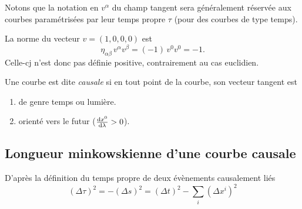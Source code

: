 {Notons que la notation en $v^\alpha$ du champ tangent sera généralement réservée aux courbes paramétrisées par leur temps propre $\tau$ (pour des courbes de type temps).
\begin{exmp}
    La norme du vecteur $v = (1,0,0,0)$ est
    \begin{equation}
        \eta_{\alpha \beta}\,v^{\alpha} v^{\beta} = (-1)\, v^{0} v^{0} =-1.
    \end{equation}
    Celle-cj n'est donc pas définie positive, contrairement au cas euclidien.
\end{exmp}
\begin{theoremframe}
    \begin{defi}
        Une courbe est dite \emph{causale} si en tout point de la courbe, son vecteur tangent est
        \begin{enumerate}[label = \roman*.]
            \item de genre temps ou lumière.
            \item orienté vers le futur ($\frac{\mathrm{d} x^0}{\mathrm{d}\lambda}>0$).
        \end{enumerate}
    \end{defi}
\end{theoremframe}
\subsection{Longueur minkowskienne d'une courbe causale}

D'après la définition du temps propre de deux évènements causalement liés
\begin{equation}
    \label{eq:temps propre}
   (\Delta \tau)^{2} = -(\Delta s)^2 = (\Delta t)^2 - \sum_{i}(\Delta x^{i})^2 
\end{equation}

}
